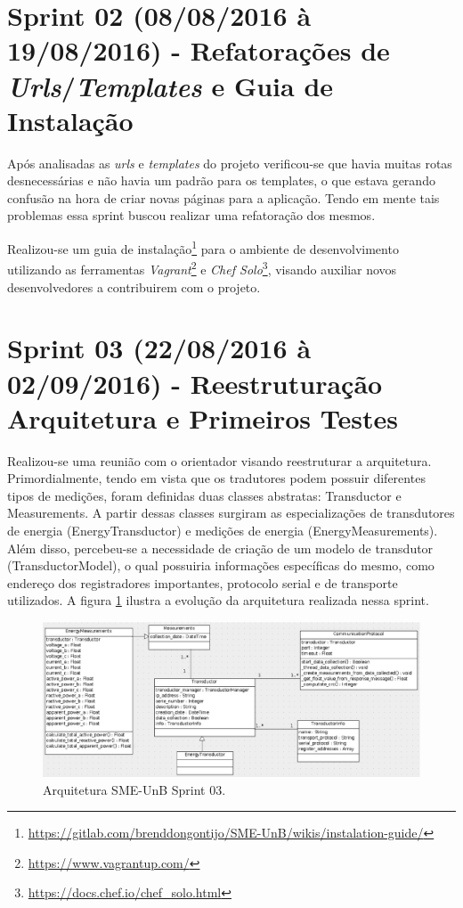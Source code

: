 \section{Sprint 02 (08/08/2016 à 19/08/2016) - Refatorações de \textit{Urls}/\textit{Templates} e Guia de Instalação}
Após analisadas as \textit{urls} e \textit{templates} do projeto verificou-se que havia muitas rotas desnecessárias e não havia um padrão para os templates, o que estava gerando confusão na hora de criar novas páginas para a aplicação. Tendo em mente tais problemas essa sprint buscou realizar uma refatoração dos mesmos.

Realizou-se um guia de instalação\footnote{\url{https://gitlab.com/brenddongontijo/SME-UnB/wikis/instalation-guide/}} para o ambiente de desenvolvimento utilizando as ferramentas \textit{Vagrant}\footnote{\url{https://www.vagrantup.com/}} e \textit{Chef Solo}\footnote{\url{https://docs.chef.io/chef_solo.html}}, visando auxiliar novos desenvolvedores a contribuirem com o projeto.

\section{Sprint 03 (22/08/2016 à 02/09/2016) - Reestruturação Arquitetura e Primeiros Testes}
Realizou-se uma reunião com o orientador visando reestruturar a arquitetura. Primordialmente, tendo em vista que os tradutores podem possuir diferentes tipos de medições, foram definidas duas classes abstratas: Transductor e Measurements. A partir dessas classes surgiram as especializações de transdutores de energia (EnergyTransductor) e medições de energia (EnergyMeasurements). Além disso, percebeu-se a necessidade de criação de um modelo de transdutor (TransductorModel), o qual possuiria informações específicas do mesmo, como endereço dos registradores importantes, protocolo serial e de transporte utilizados. A figura \ref{sprint03arq} ilustra a evolução da arquitetura realizada nessa sprint.

\begin{figure}[!htpb]
    \centering
    \includegraphics[scale=0.6,angle=90]{figuras/sprint03arq.eps}
    \caption{Arquitetura SME-UnB Sprint 03. }
    \label{sprint03arq}
\end{figure}

